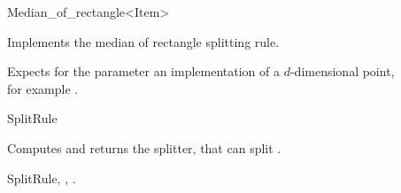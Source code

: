 
\begin{ccRefFunctionObjectClass}{Median_of_rectangle<Item>}  %


\begin{ccAdvanced}

\ccDefinition
Implements the median of rectangle splitting rule.


\ccParameters

Expects for the parameter  an implementation of 
 a $d$-dimensional point, \\
for example .

\ccIsModel

SplitRule

\ccTypes


\ccCreation
{}  %



{Computes and returns the splitter, that can split .}

\ccSeeAlso

SplitRule,
,
.

\end{ccAdvanced}

\end{ccRefFunctionObjectClass}


